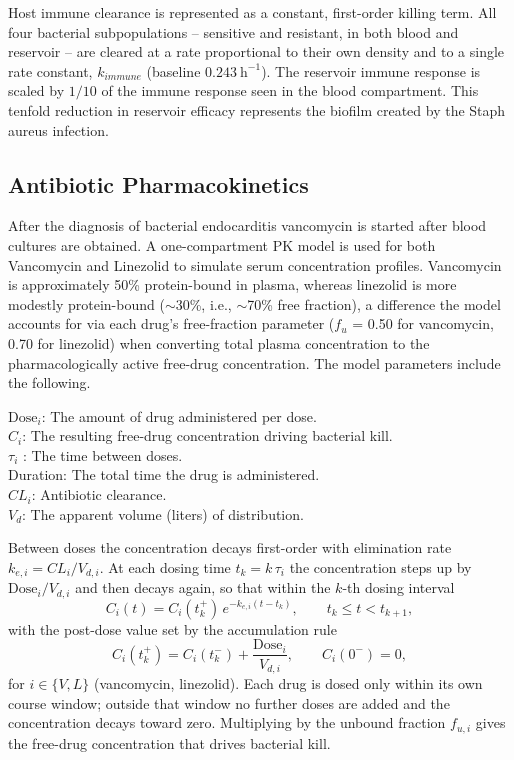 \documentclass[12pt, draftcls, onecolumn]{IEEEtran}
\begin{document}
Host immune clearance is represented as a constant, first-order killing
term. All four bacterial subpopulations -- sensitive and resistant, in both blood and
reservoir -- are cleared at a rate proportional to their own density and to
a single rate constant, $k_{immune}$ (baseline $0.243~\mathrm{h^{-1}}$).
The reservoir immune response is scaled by $1/10$ of the immune response seen in the blood compartment.  This tenfold reduction in
reservoir efficacy represents the biofilm created by the Staph aureus infection. 


\subsection{Antibiotic Pharmacokinetics}
After the diagnosis of bacterial endocarditis vancomycin is started after blood cultures are obtained. A one-compartment PK model is used for both Vancomycin and Linezolid to simulate serum concentration profiles.  Vancomycin is approximately 50\% protein-bound in plasma, whereas linezolid is more modestly protein-bound ($\sim$30\%, i.e., $\sim$70\% free fraction), a difference the model accounts for via each drug's free-fraction parameter ($f_u$ = 0.50 for vancomycin, 0.70 for linezolid) when converting total plasma concentration to the pharmacologically active free-drug concentration. The model parameters include the following.\\ 

\begin{flushleft}
$\mathrm{Dose}_{i}$: The amount of drug administered per dose. \\[0.5em]
$C_{i}$: The resulting free-drug concentration driving bacterial kill. \\[0.5em]
$\tau_{i}$ : The time between doses. \\[0.5em]
Duration: The total time the drug is administered. \\[0.5em]
$CL_{i}$: Antibiotic clearance. \\[0.5em]
$V_{d}$: The apparent volume (liters) of distribution.
\end{flushleft}






Between doses the concentration decays first-order with elimination rate
$k_{e,i} = CL_i / V_{d,i}$. At each dosing time $t_k = k\,\tau_i$ the
concentration steps up by $\mathrm{Dose}_i / V_{d,i}$ and then decays again,
so that within the $k$-th dosing interval
\begin{equation}
C_i(t) = C_i(t_k^{+})\, e^{-k_{e,i}(t - t_k)},
\qquad t_k \le t < t_{k+1},
\label{eq:pk}
\end{equation}
with the post-dose value set by the accumulation rule
\begin{equation}
C_i(t_k^{+}) = C_i(t_k^{-}) + \frac{\mathrm{Dose}_i}{V_{d,i}},
\qquad C_i(0^{-}) = 0 ,
\label{eq:pkdose}
\end{equation}
for $i \in \{V, L\}$ (vancomycin, linezolid). Each drug is dosed only within
its own course window; outside that window no further doses are added and the
concentration decays toward zero. Multiplying by the unbound fraction
$f_{u,i}$ gives the free-drug concentration that drives bacterial kill.
\end{document}
